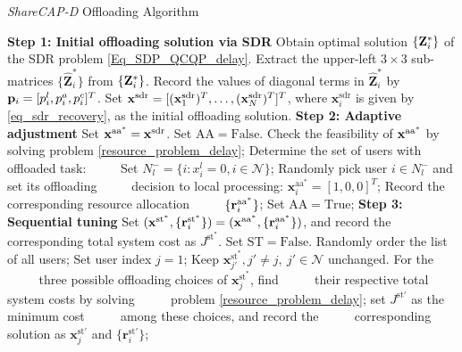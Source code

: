 \documentclass[10pt,journal,compsoc]{IEEEtran}
\def\pbf{{\bf p}}
\def\rbf{{\bf r}}
\def\xbf{{\bf x}}
\def\rbf{{\bf r}}
\def\xbf{{\bf x}}
\def\Zbf{{\bf Z}}
\begin{document}
{\begin{algorithm}[t]
  \caption{\textit{ShareCAP-D} Offloading Algorithm}
  \begin{algorithmic}[1]
  \Statex \textbf{Step 1: Initial offloading solution via SDR}
    \State Obtain optimal solution $\{\Zbf_i^*\}$ of the SDR
  problem \eqref{Eq_SDP_QCQP_delay}. Extract the upper-left $3\times 3$ sub-matrices
$\{\hat{\mathbf{Z}}_i^*\}$ from $\{\Zbf_i^*\}$.
 \State Record the values of diagonal terms in
$\hat{\mathbf{Z}}_i^*$ by $\pbf_i=[p^l_{i}, p^a_{i}, p^c_{i}]^T$.
      \State Set $\xbf^{\text{sdr}}=[(\xbf_1^{\text{sdr}})^T,\ldots,
(\xbf_N^{\text{sdr}})^T]^T$, where $\mathbf{x}^{\text{sdr}}_{i}$ is
given by \eqref{eq_sdr_recovery}, as the initial offloading
solution.
    \Statex \textbf{Step 2: Adaptive adjustment}
    \State Set $\mathbf{x}^{\text{aa}^*}=\xbf^{\text{sdr}}$.
    \State Set $\mathrm{AA}=\mathrm{False}$.
   \State Check the
feasibility of $\xbf^{\text{aa}^*}$ by solving problem
\eqref{resource_problem_delay};
    \State Determine the set of users with offloaded task:
    \Statex $\ \ \ \ \ \ \ \ \ \ \ $Set $N_l^- = \{i:x_i^l = 0, i\in \mathcal{N}\}$;
    \State Randomly pick user $i \in N_l^-$ and set its offloading
    \Statex $\ \ \ \ \ \ \ \ \ \ \ $decision to local processing: $\mathbf{x}^{\text{aa}^*}_{i}=[1,0,0]^T$;
    \Else
    \State Record the corresponding resource allocation
    \Statex $\ \ \ \ \ \ \ \ \ \ \ $$\{\rbf^{\text{aa}^*}_i\}$;
    \State Set $\mathrm{AA}=\mathrm{True}$;
    \EndIf
    \EndWhile
    \Statex \textbf{Step 3: Sequential tuning}
    \State Set $(\mathbf{x}^{\text{st}^*},\{\rbf^{\text{st}^*}_i\})=(\xbf^{\text{aa}^*},\{\rbf^{\text{aa}^*}_i\})$,
    and record the corresponding total system cost as
$J^{\text{st}^*}$.
    \State Set $\mathrm{ST}=\mathrm{False}$.
    \State Randomly order the list of all users;
    \State Set user index $j=1$;
    \State Keep $\mathbf{x}^{\text{st}^*}_{j'}, j'\neq j,\ j'\in \mathcal{N}$ unchanged.
    For the
    \Statex $\ \ \ \ \ \ \ \ \ \ $ three possible offloading choices of ${\mathbf{x}^{\text{st}^*}_j}$,
    find
    \Statex $\ \ \ \ \ \ \ \ \ \ $ their respective total system costs by
    solving
    \Statex $\ \ \ \ \ \ \ \ \ \ $ problem \eqref{resource_problem_delay}; set $J^{\mathrm{st}'}$ as the minimum cost
    \Statex $\ \ \ \ \ \ \ \ \ \ $ among these choices, and record the
    \Statex $\ \ \ \ \ \ \ \ \ \ $ corresponding solution as  $\mathbf{x}^{\mathrm{st}'}_j$ and $\{\mathbf{r}_i^{\mathrm{st}'}\}$;


\end{algorithmic}
\end{algorithm}}
\end{document}
